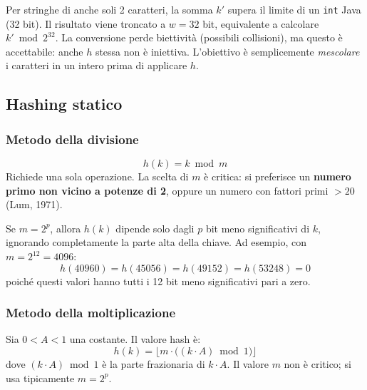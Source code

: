 \begin{nota}
	Per stringhe di anche soli 2 caratteri, la somma $k'$ supera il limite di
	un \texttt{int} Java (32 bit). Il risultato viene troncato a $w = 32$ bit,
	equivalente a calcolare $k' \bmod 2^{32}$. La conversione perde biettività
	(possibili collisioni), ma questo è accettabile: anche $h$ stessa non è
	iniettiva. L'obiettivo è semplicemente \emph{mescolare} i caratteri in un
	intero prima di applicare $h$.
\end{nota}

\subsection{Hashing statico}

\subsubsection{Metodo della divisione}

\begin{definizione}
	\[
	h(k) = k \bmod m
	\]
	Richiede una sola operazione. La scelta di $m$ è critica: si preferisce un
	\textbf{numero primo non vicino a potenze di 2}, oppure un numero con
	fattori primi $> 20$ (Lum, 1971).
\end{definizione}

\begin{hardnote}
	Se $m = 2^p$, allora $h(k)$ dipende solo dagli $p$ bit meno significativi
	di $k$, ignorando completamente la parte alta della chiave. Ad esempio, con
	$m = 2^{12} = 4096$:
	\[
	h(40960) = h(45056) = h(49152) = h(53248) = 0
	\]
	poiché questi valori hanno tutti i 12 bit meno significativi pari a zero.
\end{hardnote}

\subsubsection{Metodo della moltiplicazione}

\begin{definizione}
	Sia $0 < A < 1$ una costante. Il valore hash è:
	\[
	h(k) = \bigl\lfloor m \cdot \bigl((k \cdot A) \bmod 1\bigr) \bigr\rfloor
	\]
	dove $(k \cdot A) \bmod 1$ è la parte frazionaria di $k \cdot A$. Il valore
	$m$ non è critico; si usa tipicamente $m = 2^p$.
\end{definizione}

